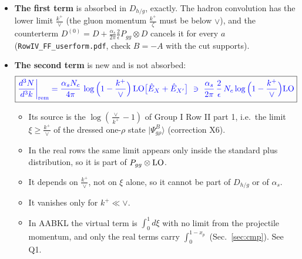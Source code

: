 \documentclass[10pt]{article}
\numberwithin{equation}{section}
\newcommand{\new}[1]{{\color{blue}#1}}
\newcommand{\Eh}{\hat E}
\begin{document}
\begin{itemize}
\item \textbf{The first term} is absorbed in $D_{h/g}$, exactly. The hadron convolution has the lower limit $\frac{k^+}{\vee}$ (the gluon momentum $\frac{k^+}{\zeta}$ must be below $\vee$), and the counterterm $D^{(0)}=D+\frac{\alpha_s}{2\pi}\frac2\epsilon P_{gg}\otimes D$ cancels it for every $a$ (\texttt{RowIV\_FF\_userform.pdf}, check $B=-A$ with the cut supports).
\item \textbf{The second term} is new and is not absorbed:
\begin{equation}
\boxed{\new{\frac{d^3N}{d^3k}\bigg|_{\rm rem}=\frac{\alpha_sN_c}{4\pi}\,\log\Big(1-\frac{k^+}{\vee}\Big)\,{\rm LO}\big[\Eh_X+\Eh_{X'}\big]\ \ni\ \frac{\alpha_s}{2\pi}\,\frac{2}{\epsilon}\,N_c\log\Big(1-\frac{k^+}{\vee}\Big){\rm LO}}}
\label{eq:rem}
\end{equation}
\begin{itemize}
\item Its source is the $\log(\frac{\vee}{k^+}-1)$ of Group I Row II part 1, i.e.\ the limit $\xi\ge\frac{k^+}{\vee}$ of the dressed one-$\rho$ state $|\Psi^B_{g\rho}\rangle$ (correction X6).
\item In the real rows the same limit appears only inside the standard plus distribution, so it is part of $P_{gg}\otimes{\rm LO}$.
\item It depends on $\frac{k^+}{\vee}$, not on $\xi$ alone, so it cannot be part of $D_{h/g}$ or of $\alpha_s$.
\item It vanishes only for $k^+\ll\vee$.
\item In AABKL the virtual term is $\int_0^1d\xi$ with no limit from the projectile momentum, and only the real terms carry $\int_0^{1-x_p}$ (Sec.~\ref{sec:cmp}). See Q1.
\end{itemize}
\end{itemize}
\end{document}
